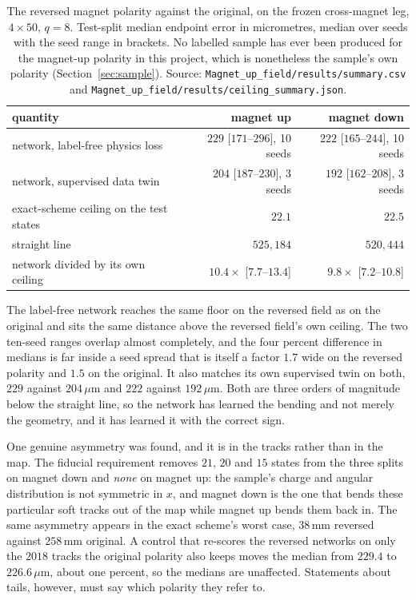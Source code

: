 \documentclass[11pt,a4paper]{article}
\newcommand{\um}{\ensuremath{\,\mu\mathrm{m}}}
\newcommand{\mm}{\ensuremath{\,\mathrm{mm}}}
\begin{document}
\begin{table}[tbp]
  \centering
  \caption{The reversed magnet polarity against the original, on the frozen
  cross-magnet leg, $4 \times 50$, $q = 8$. Test-split median endpoint error in
  micrometres, median over seeds with the seed range in brackets. No labelled
  sample has ever been produced for the magnet-up polarity in this project,
  which is nonetheless the sample's own polarity
  (Section~\ref{sec:sample}).
  Source: \texttt{Magnet\_up\_field/results/summary.csv} and
  \texttt{Magnet\_up\_field/results/ceiling\_summary.json}.}
  \label{tab:magnetup}
  \small
  \begin{tabular}{lrr}
    \toprule
    quantity & magnet up & magnet down \\
    \midrule
    network, label-free physics loss & $229$ [$171$--$296$], 10 seeds
                                     & $222$ [$165$--$244$], 10 seeds \\
    network, supervised data twin    & $204$ [$187$--$230$], 3 seeds
                                     & $192$ [$162$--$208$], 3 seeds \\
    exact-scheme ceiling on the test states & $22.1$ & $22.5$ \\
    straight line & $525{,}184$ & $520{,}444$ \\
    network divided by its own ceiling & $10.4\times$ [$7.7$--$13.4$]
                                       & $9.8\times$ [$7.2$--$10.8$] \\
    \bottomrule
  \end{tabular}
\end{table}

The label-free network reaches the same floor on the reversed field as on the
original and sits the same distance above the reversed field's own ceiling. The
two ten-seed ranges overlap almost completely, and the four percent difference
in medians is far inside a seed spread that is itself a factor $1.7$ wide on the
reversed polarity and $1.5$ on the original. It also matches its own supervised
twin on both, $229$ against $204\um$ and $222$ against $192\um$. Both are three
orders of magnitude below the straight line, so the network has learned the
bending and not merely the geometry, and it has learned it with the correct
sign.

One genuine asymmetry was found, and it is in the tracks rather than in the map.
The fiducial requirement removes $21$, $20$ and $15$ states from the three
splits on magnet down and \emph{none} on magnet up: the
sample's charge and angular distribution is not symmetric in $x$, and magnet
down is the one that bends these particular soft tracks out of the
map while magnet up bends them back in. The same asymmetry appears
in the exact scheme's worst case, $38\mm$ reversed against $258\mm$ original. A
control that re-scores the reversed networks on only the $2018$ tracks the
original polarity also keeps moves the median from $229.4$ to $226.6\um$, about
one percent, so the medians are unaffected. Statements about tails, however,
must say which polarity they refer to.
\end{document}
